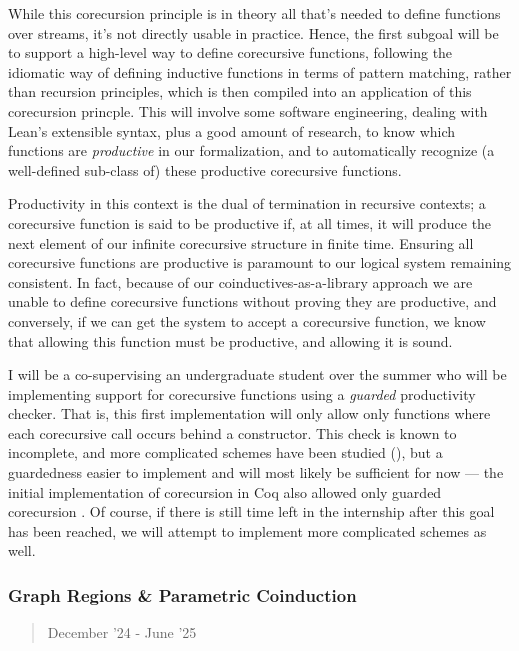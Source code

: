 \documentclass[a4paper]{scrartcl}
\begin{document}
While this corecursion principle is in theory all that's needed to
define functions over streams, it's not directly usable in practice.
Hence, the first subgoal will be to support a high-level way to define
corecursive functions, following the idiomatic way of defining inductive
functions in terms of pattern matching, rather than recursion
principles, which is then compiled into an application of this
corecursion princple. This will involve some software engineering,
dealing with Lean's extensible syntax, plus a good amount of research,
to know which functions are \emph{productive} in our formalization, and
to automatically recognize (a well-defined sub-class of) these
productive corecursive functions.

Productivity in this context is the dual of termination in recursive
contexts; a corecursive function is said to be productive if, at all
times, it will produce the next element of our infinite corecursive
structure in finite time. Ensuring all corecursive functions are
productive is paramount to our logical system remaining consistent. In
fact, because of our coinductives-as-a-library approach we are unable to
define corecursive functions without proving they are productive, and
conversely, if we can get the system to accept a corecursive function,
we know that allowing this function must be productive, and allowing it
is sound.

I will be a co-supervising an undergraduate student over the summer who
will be implementing support for corecursive functions using a
\emph{guarded} productivity checker. That is, this first implementation
will only allow only functions where each corecursive call occurs behind
a constructor. This check is known to incomplete, and more complicated
schemes have been studied
(\cite{blanchetteFriendsBenefitsImplementing2017}), but a
guardedness easier to implement and will most likely be sufficient for
now --- the initial implementation of corecursion in Coq also allowed
only guarded corecursion \cite{gimenezTutorialRecursiveTypes1998}.
Of course, if there is still time left in the internship after this goal
has been reached, we will attempt to implement more complicated schemes
as well.


\subsubsection{Graph Regions \& Parametric
Coinduction}\label{graph-regions-parametric-coinduction}

\begin{quote}
December '24 - June '25
\end{quote}
\end{document}
